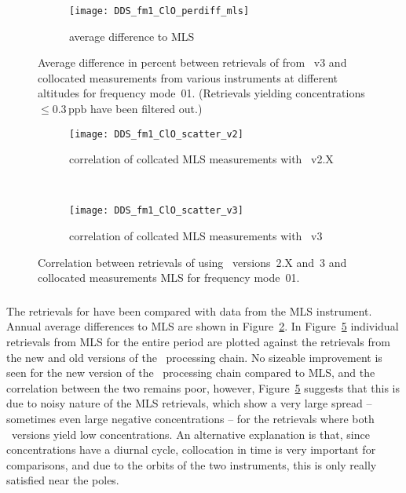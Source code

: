 
\begin{figure}[htpb]
    \centering
    \begin{subfigure}[b]{0.49\textwidth}
        \texttt{[image: DDS\_fm1\_ClO\_perdiff\_mls]}
        \caption{average difference to MLS}
        \label{fig:fm01:ClO:profiles:MLS}
    \end{subfigure}
    \caption{Average difference in percent between retrievals of 
    from \smr~v3 and collocated measurements from various instruments at
    different altitudes for frequency mode~01. (Retrievals yielding
    concentrations $\leq 0.3\,\mathrm{ppb}$ have been filtered out.)}
    \label{fig:fm01:ClO:profiles}
\end{figure}

\begin{figure}[htpb]
    \centering
    \begin{subfigure}[b]{0.49\textwidth}
        \texttt{[image: DDS\_fm1\_ClO\_scatter\_v2]}
        \caption{correlation of collcated MLS measurements with \smr~v2.X}
        \label{fig:fm01:ClO:scatter:v2}
    \end{subfigure}
    \,
    \begin{subfigure}[b]{0.49\textwidth}
        \texttt{[image: DDS\_fm1\_ClO\_scatter\_v3]}
        \caption{correlation of collcated MLS measurements with \smr~v3}
        \label{fig:fm01:ClO:scatter:v3}
    \end{subfigure}
    \caption{Correlation between retrievals of  using \smr\
    versions~2.X and~3 and collocated measurements MLS for frequency mode~01.}
    \label{fig:fm01:ClO:scatter}
\end{figure}

\subsubsection{}
\label{sec:fm01:comparison:ClO}
The retrievals for \chem{ClO} have been compared with data from the MLS
instrument. Annual average differences to MLS are shown in
Figure~\ref{fig:fm01:ClO:profiles}. In Figure~\ref{fig:fm01:ClO:scatter}
individual retrievals from MLS for the entire period are plotted against the
retrievals from the new and old versions of the \smr\ processing chain. No
sizeable improvement is seen for the new version of the \smr\ processing chain
compared to MLS, and the correlation between the two remains poor, however,
Figure~\ref{fig:fm01:ClO:scatter} suggests that this is due to noisy nature of
the MLS retrievals, which show a very large spread -- sometimes even large
negative concentrations -- for the retrievals where both \smr\ versions yield
low  concentrations. An alternative explanation is that, since
\chem{ClO} concentrations have a diurnal cycle, collocation in time is very
important for comparisons, and due to the orbits of the two instruments, this
is only really satisfied near the poles.


